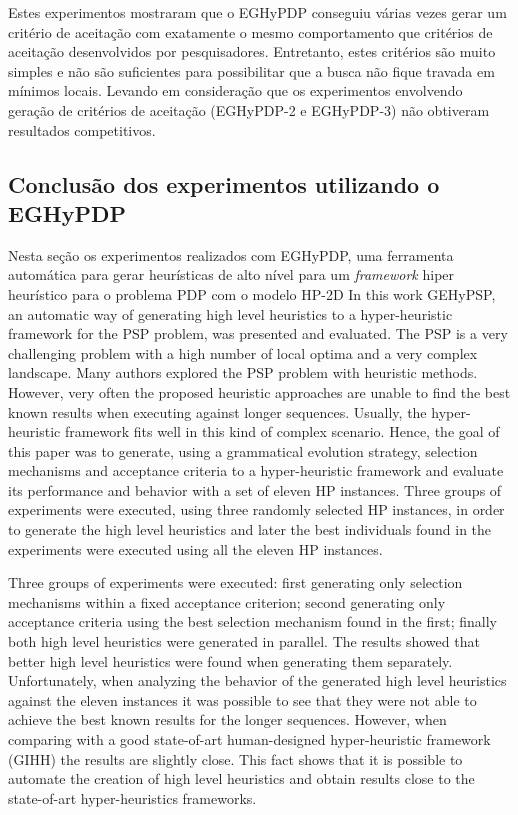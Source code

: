	Estes experimentos mostraram que o EGHyPDP conseguiu várias vezes gerar um critério de aceitação com exatamente o mesmo comportamento que critérios de aceitação desenvolvidos por pesquisadores. Entretanto, estes critérios são muito simples e não são suficientes para possibilitar que a busca não fique travada em mínimos locais. Levando em consideração que os experimentos envolvendo geração de critérios de aceitação (EGHyPDP-2 e EGHyPDP-3) não obtiveram resultados competitivos. 
	
	
	\subsection{Conclusão dos experimentos utilizando o EGHyPDP}
	
	Nesta seção os experimentos realizados com EGHyPDP, uma ferramenta automática para gerar heurísticas de alto nível para um \textit{framework} hiper heurístico para o problema PDP com o modelo HP-2D
	In this work  GEHyPSP, an automatic way of generating high level heuristics to a hyper-heuristic framework for the PSP problem, was presented and evaluated. The PSP is a very challenging problem  with a high number of local optima and a very complex landscape. Many authors explored the PSP problem with heuristic methods. 
	However, very often the proposed heuristic approaches are unable to find the best known results when executing against longer sequences. Usually, the hyper-heuristic framework fits well in this kind of complex scenario. Hence, the goal of this paper was to generate, using a grammatical evolution strategy, selection mechanisms and acceptance criteria to a hyper-heuristic framework and evaluate its performance and behavior with a set of eleven HP instances. Three groups of experiments were executed, using three randomly selected HP instances, in order to generate the high level heuristics and later the best individuals found in the experiments were executed using all the eleven HP instances. 
	
	Three groups of experiments were executed: first generating only selection mechanisms within a fixed acceptance criterion; second generating only acceptance criteria using the best selection mechanism found in the first; finally both high level heuristics were generated in parallel. The results showed that better high level heuristics were found when generating them separately. Unfortunately, when analyzing the behavior of the generated high level heuristics against the eleven instances it was possible to see that they were not able to achieve the best known results for the longer sequences. However, when comparing with a good state-of-art human-designed hyper-heuristic framework (GIHH) \cite{misir2012intelligent} the results are slightly close. This fact shows that it is possible to automate the creation of high level heuristics and obtain results close to the state-of-art hyper-heuristics frameworks. 
	
